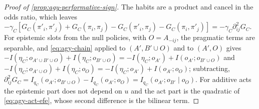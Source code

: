 \begin{proof}[Proof of \cref{prop:agy-performative-sign}]
The habits are a product and cancel in the odds ratio, which leaves $-\gamma_C[G_C(\pi'_i,\pi'_j)+G_C(\pi_i,\pi_j)-G_C(\pi'_i,\pi_j)-G_C(\pi_i,\pi'_j)]=-\gamma_C\partial^2_{ij}G_C$. For epistemic slots from the null policies, with $O=A_{-ij}$, the pragmatic terms are separable, and \eqref{eq:agy-chain} applied to $(A',B'\cup O)$ and to $(A',O)$ gives $-I(\eta_C;o_{A'\cup B'\cup O})+I(\eta_C;o_{B'\cup O})=-I(\eta_C;o_{A'})+I(o_{A'};o_{B'\cup O})$ and $-I(\eta_C;o_{A'\cup O})+I(\eta_C;o_O)=-I(\eta_C;o_{A'})+I(o_{A'};o_O)$; subtracting, $\partial^2_{ij}G_C=I_{q_C}(o_{A'};o_{B'\cup O})-I_{q_C}(o_{A'};o_O)=I_{q_C}(o_{A'};o_{B'}\mid o_O)$. For additive acts the epistemic part does not depend on $u$ and the act part is the quadratic of \eqref{eq:agy-act-efe}, whose second difference is the bilinear term.
\end{proof}


